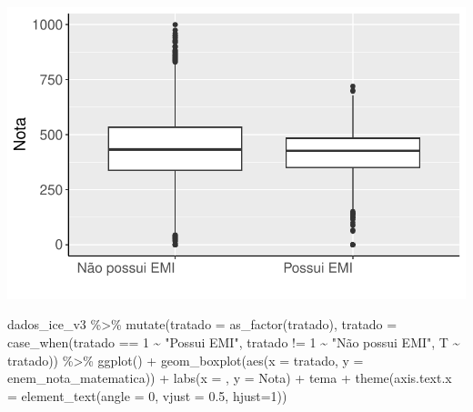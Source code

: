 \documentclass[
  letterpaper,
  DIV=11,
  numbers=noendperiod]{scrartcl}
\newenvironment{Shaded}{\begin{snugshade}}{\end{snugshade}}
\newcommand{\AttributeTok}[1]{\textcolor[rgb]{0.40,0.45,0.13}{#1}}
\newcommand{\DecValTok}[1]{\textcolor[rgb]{0.68,0.00,0.00}{#1}}
\newcommand{\FloatTok}[1]{\textcolor[rgb]{0.68,0.00,0.00}{#1}}
\newcommand{\FunctionTok}[1]{\textcolor[rgb]{0.28,0.35,0.67}{#1}}
\newcommand{\NormalTok}[1]{\textcolor[rgb]{0.00,0.23,0.31}{#1}}
\newcommand{\SpecialCharTok}[1]{\textcolor[rgb]{0.37,0.37,0.37}{#1}}
\newcommand{\StringTok}[1]{\textcolor[rgb]{0.13,0.47,0.30}{#1}}
\begin{document}
\includegraphics[width=1\textwidth,height=1\textheight]{script_files/figure-latex/unnamed-chunk-9-1.pdf}

\begin{Shaded}
\begin{Highlighting}[]
\NormalTok{dados\_ice\_v3 }\SpecialCharTok{\%\textgreater{}\%} 
  \FunctionTok{mutate}\NormalTok{(}\AttributeTok{tratado =} \FunctionTok{as\_factor}\NormalTok{(tratado),}
    \AttributeTok{tratado =} \FunctionTok{case\_when}\NormalTok{(tratado }\SpecialCharTok{==} \DecValTok{1} \SpecialCharTok{\textasciitilde{}} \StringTok{"Possui EMI"}\NormalTok{,}
\NormalTok{                        tratado }\SpecialCharTok{!=} \DecValTok{1} \SpecialCharTok{\textasciitilde{}} \StringTok{"Não possui EMI"}\NormalTok{,}
\NormalTok{                        T }\SpecialCharTok{\textasciitilde{}}\NormalTok{ tratado)) }\SpecialCharTok{\%\textgreater{}\%} 
  \FunctionTok{ggplot}\NormalTok{() }\SpecialCharTok{+}
  \FunctionTok{geom\_boxplot}\NormalTok{(}\FunctionTok{aes}\NormalTok{(}\AttributeTok{x =}\NormalTok{ tratado, }\AttributeTok{y =}\NormalTok{ enem\_nota\_matematica)) }\SpecialCharTok{+}
  \FunctionTok{labs}\NormalTok{(}\AttributeTok{x =}  \StringTok{\textquotesingle{}\textquotesingle{}}\NormalTok{, }\AttributeTok{y =} \StringTok{\textquotesingle{}Nota\textquotesingle{}}\NormalTok{) }\SpecialCharTok{+}
\NormalTok{  tema }\SpecialCharTok{+}
  \FunctionTok{theme}\NormalTok{(}\AttributeTok{axis.text.x =} \FunctionTok{element\_text}\NormalTok{(}\AttributeTok{angle =} \DecValTok{0}\NormalTok{, }\AttributeTok{vjust =} \FloatTok{0.5}\NormalTok{, }\AttributeTok{hjust=}\DecValTok{1}\NormalTok{))}
\end{Highlighting}
\end{Shaded}
\end{document}
